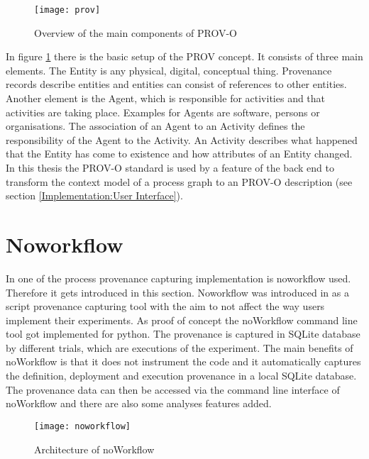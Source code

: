 \documentclass[draft,final]{vutinfth} %
\begin{document}
\begin{figure}[h]
	\centering
	\texttt{[image: prov]}
	\caption{Overview of the main components of PROV-O \cite{733f89c65e4844f9aabcae1c276a5602}}
	\label{fig:prov} %
\end{figure}

In figure \ref{fig:prov} there is the basic setup of the PROV concept. It consists of three main elements. The Entity is any physical, digital, conceptual thing. Provenance records describe entities and entities can consist of references to other entities. Another element is the Agent, which is responsible for activities and that activities are taking place. Examples for Agents are software, persons or organisations. The association of an Agent to an Activity defines the responsibility of the Agent to the Activity. An Activity describes what happened that the Entity has come to existence and how attributes of an Entity changed.\cite{f06eee9045b445be89cf07100b3ce05c} In this thesis the PROV-O standard is used by a feature of the back end to transform the context model of a process graph to an PROV-O description (see section \ref{Implementation:User Interface}). 

\section{Noworkflow}\label{Noworkflow}

In one of the process provenance capturing implementation is noworkflow used. Therefore it gets introduced in this section. Noworkflow was introduced in \cite{c9e0604becba42af96a9cb0a6f60018b} as a script provenance capturing tool with the aim to not affect the way users implement their experiments. As proof of concept the noWorkflow command line tool got implemented for python. The provenance is captured in SQLite database by different trials, which are executions of the experiment. The main benefits of noWorkflow is that it does not instrument the code and it automatically captures the definition, deployment and execution provenance in a local SQLite database. The provenance data can then be accessed via the command line interface of noWorkflow and there are also some analyses features added.\cite{c9e0604becba42af96a9cb0a6f60018b}

\begin{figure}[h]
	\centering
	\texttt{[image: noworkflow]}
	\caption{Architecture of noWorkflow \cite{c9e0604becba42af96a9cb0a6f60018b}}
	\label{fig:noworkflow} %
\end{figure}
\end{document}

